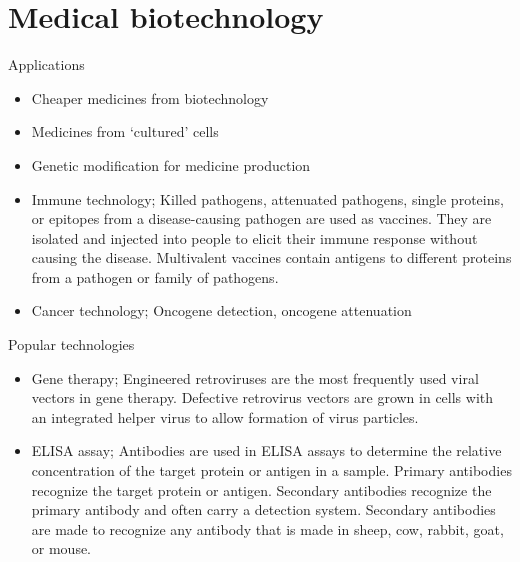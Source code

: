 \documentclass[
  ignorenonframetext,
  aspectratio=169]{beamer}
\providecommand{\tightlist}{%
  \setlength{\itemsep}{0pt}\setlength{\parskip}{0pt}}
\begin{document}
\hypertarget{medical-biotechnology}{%
\section{Medical biotechnology}\label{medical-biotechnology}}

\begin{frame}{Applications}
\protect\hypertarget{applications-1}{}
\begin{itemize}
\tightlist
\item
  Cheaper medicines from biotechnology
\item
  Medicines from `cultured' cells
\item
  Genetic modification for medicine production
\item
  Immune technology; Killed pathogens, attenuated pathogens, single
  proteins, or epitopes from a disease-causing pathogen are used as
  vaccines. They are isolated and injected into people to elicit their
  immune response without causing the disease. Multivalent vaccines
  contain antigens to different proteins from a pathogen or family of
  pathogens.
\item
  Cancer technology; Oncogene detection, oncogene attenuation
\end{itemize}
\end{frame}

\begin{frame}{Popular technologies}
\protect\hypertarget{popular-technologies}{}
\begin{itemize}
\tightlist
\item
  Gene therapy; Engineered retroviruses are the most frequently used
  viral vectors in gene therapy. Defective retrovirus vectors are grown
  in cells with an integrated helper virus to allow formation of virus
  particles.
\item
  ELISA assay; Antibodies are used in ELISA assays to determine the
  relative concentration of the target protein or antigen in a sample.
  Primary antibodies recognize the target protein or antigen. Secondary
  antibodies recognize the primary antibody and often carry a detection
  system. Secondary antibodies are made to recognize any antibody that
  is made in sheep, cow, rabbit, goat, or mouse.
\end{itemize}
\end{frame}
\end{document}
